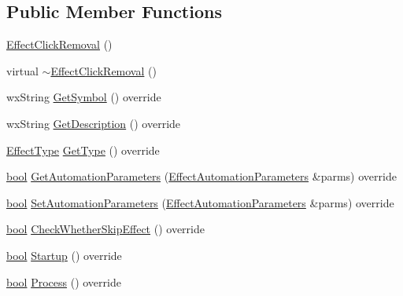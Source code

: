 \subsection*{Public Member Functions}
\begin{DoxyCompactItemize}
\item 
\hyperlink{class_effect_click_removal_a31a4ae28ef6090bc08266326744d01f1}{Effect\+Click\+Removal} ()
\item 
virtual \hyperlink{class_effect_click_removal_a7bcdd167b3dfc2c26433413640cd7de6}{$\sim$\+Effect\+Click\+Removal} ()
\item 
wx\+String \hyperlink{class_effect_click_removal_a621d97695c55a6a70b032171bd2aab3c}{Get\+Symbol} () override
\item 
wx\+String \hyperlink{class_effect_click_removal_a357c67fad853c312b2b36548a151a609}{Get\+Description} () override
\item 
\hyperlink{_effect_interface_8h_a4809a7bb3fd1a421902a667cc1405d43}{Effect\+Type} \hyperlink{class_effect_click_removal_ab45f5e604952473cc6e7d19d98b5f831}{Get\+Type} () override
\item 
\hyperlink{mac_2config_2i386_2lib-src_2libsoxr_2soxr-config_8h_abb452686968e48b67397da5f97445f5b}{bool} \hyperlink{class_effect_click_removal_ab19f9218563bd31583a13a696bec8ad6}{Get\+Automation\+Parameters} (\hyperlink{class_effect_automation_parameters}{Effect\+Automation\+Parameters} \&parms) override
\item 
\hyperlink{mac_2config_2i386_2lib-src_2libsoxr_2soxr-config_8h_abb452686968e48b67397da5f97445f5b}{bool} \hyperlink{class_effect_click_removal_a8ea5851d504e3e2635828f9c26d7404c}{Set\+Automation\+Parameters} (\hyperlink{class_effect_automation_parameters}{Effect\+Automation\+Parameters} \&parms) override
\item 
\hyperlink{mac_2config_2i386_2lib-src_2libsoxr_2soxr-config_8h_abb452686968e48b67397da5f97445f5b}{bool} \hyperlink{class_effect_click_removal_a122b59a9674443ee3d501dcf93aacc5b}{Check\+Whether\+Skip\+Effect} () override
\item 
\hyperlink{mac_2config_2i386_2lib-src_2libsoxr_2soxr-config_8h_abb452686968e48b67397da5f97445f5b}{bool} \hyperlink{class_effect_click_removal_ab0cee6772807e857034cbabc6bbe225e}{Startup} () override
\item 
\hyperlink{mac_2config_2i386_2lib-src_2libsoxr_2soxr-config_8h_abb452686968e48b67397da5f97445f5b}{bool} \hyperlink{class_effect_click_removal_a992c6ea95b73bff515baeb75d6cbb346}{Process} () override
\item 

\end{DoxyCompactItemize}

